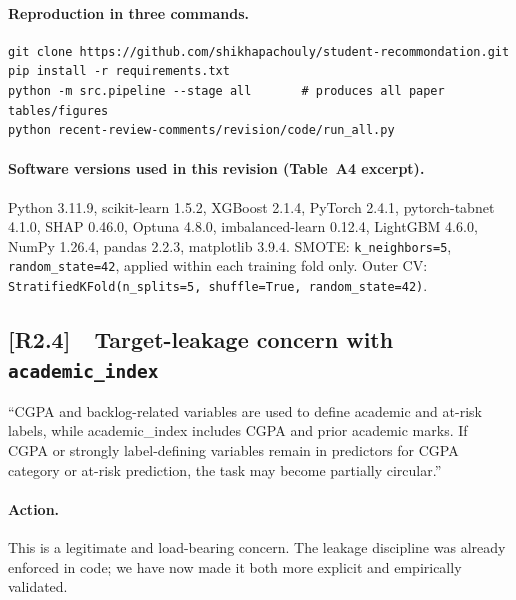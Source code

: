 \documentclass[11pt,a4paper]{article}
\newcommand{\cid}[1]{\textcolor{revred}{\textbf{[#1]}}}
\begin{document}
\begin{itemize}
\paragraph{Reproduction in three commands.}

\begin{verbatim}
git clone https://github.com/shikhapachouly/student-recommondation.git
pip install -r requirements.txt
python -m src.pipeline --stage all       # produces all paper tables/figures
python recent-review-comments/revision/code/run_all.py
\end{verbatim}

\paragraph{Software versions used in this revision (Table~A4 excerpt).}
Python 3.11.9, scikit-learn 1.5.2, XGBoost 2.1.4, PyTorch 2.4.1, pytorch-tabnet 4.1.0, SHAP 0.46.0, Optuna 4.8.0, imbalanced-learn 0.12.4, LightGBM 4.6.0, NumPy 1.26.4, pandas 2.2.3, matplotlib 3.9.4. SMOTE: \texttt{k\_neighbors=5}, \texttt{random\_state=42}, applied within each training fold only. Outer CV: \texttt{StratifiedKFold(n\_splits=5, shuffle=True, random\_state=42)}.

\subsection*{\cid{R2.4}~~Target-leakage concern with \texttt{academic\_index}}

\begin{reviewerquote}
``CGPA and backlog-related variables are used to define academic and at-risk labels, while academic\_index includes CGPA and prior academic marks. If CGPA or strongly label-defining variables remain in predictors for CGPA category or at-risk prediction, the task may become partially circular.''
\end{reviewerquote}

\paragraph{Action.} This is a legitimate and load-bearing concern. The leakage discipline was already  enforced in code; we have now made it both more explicit and empirically validated.


\end{itemize}
\end{document}
